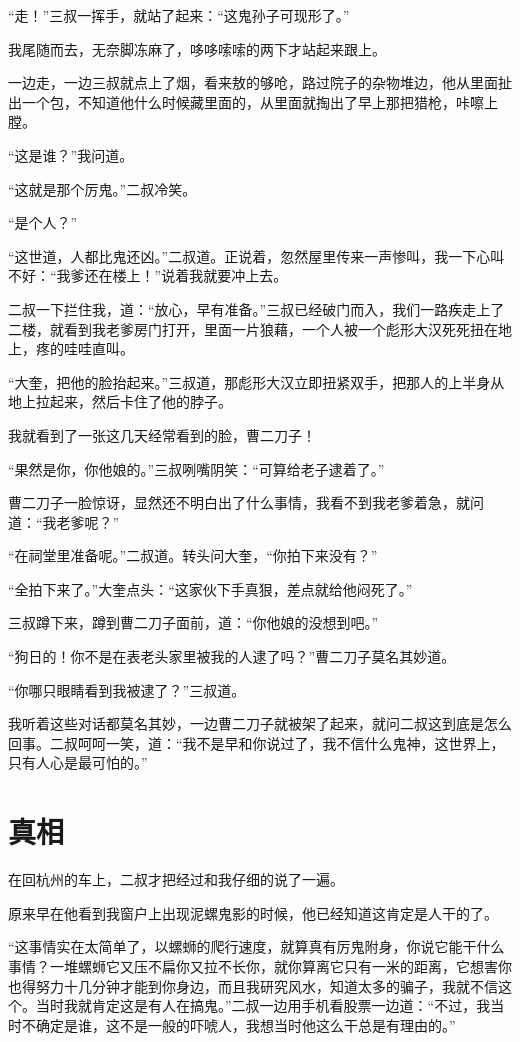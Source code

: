 “走！”三叔一挥手，就站了起来：“这鬼孙子可现形了。”

我尾随而去，无奈脚冻麻了，哆哆嗦嗦的两下才站起来跟上。

一边走，一边三叔就点上了烟，看来敖的够呛，路过院子的杂物堆边，他从里面扯出一个包，不知道他什么时候藏里面的，从里面就掏出了早上那把猎枪，咔嚓上膛。

“这是谁？”我问道。

“这就是那个厉鬼。”二叔冷笑。

“是个人？”

“这世道，人都比鬼还凶。”二叔道。正说着，忽然屋里传来一声惨叫，我一下心叫不好：“我爹还在楼上！”说着我就要冲上去。

二叔一下拦住我，道：“放心，早有准备。”三叔已经破门而入，我们一路疾走上了二楼，就看到我老爹房门打开，里面一片狼藉，一个人被一个彪形大汉死死扭在地上，疼的哇哇直叫。

“大奎，把他的脸抬起来。”三叔道，那彪形大汉立即扭紧双手，把那人的上半身从地上拉起来，然后卡住了他的脖子。

我就看到了一张这几天经常看到的脸，曹二刀子！

“果然是你，你他娘的。”三叔咧嘴阴笑：“可算给老子逮着了。”

曹二刀子一脸惊讶，显然还不明白出了什么事情，我看不到我老爹着急，就问道：“我老爹呢？”

“在祠堂里准备呢。”二叔道。转头问大奎，“你拍下来没有？”

“全拍下来了。”大奎点头：“这家伙下手真狠，差点就给他闷死了。”

三叔蹲下来，蹲到曹二刀子面前，道：“你他娘的没想到吧。”

“狗日的！你不是在表老头家里被我的人逮了吗？”曹二刀子莫名其妙道。

“你哪只眼睛看到我被逮了？”三叔道。

我听着这些对话都莫名其妙，一边曹二刀子就被架了起来，就问二叔这到底是怎么回事。二叔呵呵一笑，道：“我不是早和你说过了，我不信什么鬼神，这世界上，只有人心是最可怕的。”

\chapter{真相}

在回杭州的车上，二叔才把经过和我仔细的说了一遍。

原来早在他看到我窗户上出现泥螺鬼影的时候，他已经知道这肯定是人干的了。

“这事情实在太简单了，以螺蛳的爬行速度，就算真有厉鬼附身，你说它能干什么事情？一堆螺蛳它又压不扁你又拉不长你，就你算离它只有一米的距离，它想害你也得努力十几分钟才能到你身边，而且我研究风水，知道太多的骗子，我就不信这个。当时我就肯定这是有人在搞鬼。”二叔一边用手机看股票一边道：“不过，我当时不确定是谁，这不是一般的吓唬人，我想当时他这么干总是有理由的。”

